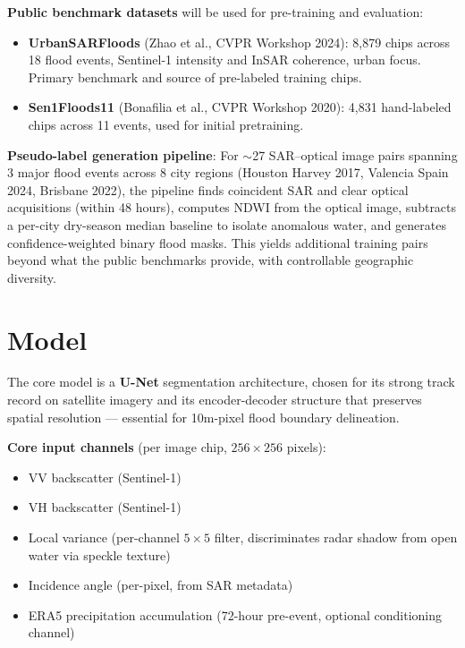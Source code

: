 \documentclass[11pt]{article}
\begin{document}
\textbf{Public benchmark datasets} will be used for pre-training and evaluation:

\begin{itemize}[noitemsep]
    \item \textbf{UrbanSARFloods} (Zhao et al., CVPR Workshop 2024): 8,879 chips
    across 18 flood events, Sentinel-1 intensity and InSAR coherence, urban focus.
    Primary benchmark and source of pre-labeled training chips.
    \item \textbf{Sen1Floods11} (Bonafilia et al., CVPR Workshop 2020): 4,831
    hand-labeled chips across 11 events, used for initial pretraining.
\end{itemize}

\textbf{Pseudo-label generation pipeline}: For $\sim$27 SAR--optical image pairs spanning 3 major flood events across 8 city regions (Houston Harvey 2017, Valencia Spain 2024, Brisbane 2022), the pipeline
finds coincident SAR and clear optical acquisitions (within 48 hours), computes NDWI
from the optical image, subtracts a per-city dry-season median baseline to isolate
anomalous water, and generates confidence-weighted binary flood masks. This yields
additional training pairs beyond what the public benchmarks provide, with controllable
geographic diversity.

\section*{Model}

The core model is a \textbf{U-Net} segmentation architecture, chosen for its strong
track record on satellite imagery and its encoder-decoder structure that preserves
spatial resolution --- essential for 10m-pixel flood boundary delineation.

\textbf{Core input channels} (per image chip, $256 \times 256$ pixels):
\begin{itemize}[noitemsep]
    \item VV backscatter (Sentinel-1)
    \item VH backscatter (Sentinel-1)
    \item Local variance (per-channel $5\times5$ filter, discriminates radar shadow from open water via speckle texture)
    \item Incidence angle (per-pixel, from SAR metadata)
    \item ERA5 precipitation accumulation (72-hour pre-event, optional conditioning channel)
\end{itemize}
\end{document}

